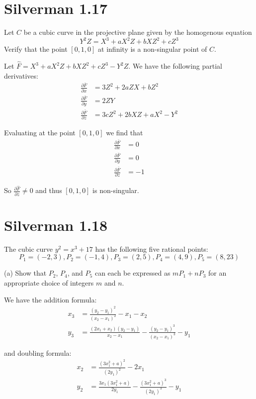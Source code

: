 \documentclass{article}
\begin{document}
\section{Silverman 1.17}
Let $C$ be a cubic curve in the projective plane given by the homogenous equation 
$$Y^2 Z = X^3 + aX^2 Z + bXZ^2 + cZ^3$$
Verify that the point $[0,1,0]$ at infinity is a non-singular point of $C$.

Let $\hat F = X^3 + aX^2 Z + bXZ^2 + cZ^3 - Y^2Z$. We have the following partial derivatives:
\begin{align*}
\frac{\partial \bar F}{\partial x} &= 3Z^2 + 2aZX + bZ^2 \\
\frac{\partial \bar F}{\partial y} &= 2ZY \\
\frac{\partial \bar F}{\partial z} &= 3cZ^2 + 2bXZ + aX^2 - Y^2
\end{align*}

Evaluating at the point $[0,1,0]$ we find that
\begin{align*}
\frac{\partial \bar F}{\partial x} &= 0 \\
\frac{\partial \bar F}{\partial y} &= 0 \\
\frac{\partial \bar F}{\partial z} &= -1
\end{align*}

So $\frac{\partial \hat F}{\partial z} \neq 0$ and thus $[0,1,0]$ is non-singular.

\section{Silverman 1.18}
The cubic curve $y^2 = x^3 + 17$ has the following five rational points:
$$P_1 = (-2,3), P_2 = (-1,4), P_3 = (2,5), P_4 = (4,9), P_5 = (8,23)$$

(a) Show that $P_2$, $P_4$, and $P_5$ can each be expressed as $mP_1 + nP_3$ for an appropriate choice of integers $m$ and $n$.

We have the addition formula:
\begin{align*}
x_3 &= \frac{(y_2 - y_1)^2}{(x_2-x_1)^2} - x_1 - x_2 \\
y_3 &= \frac{(2x_1 + x_2)(y_2-y_1)}{x_2-x_1} - \frac{(y_2-y_1)^3}{(x_2-x_1)^3} - y_1
\end{align*}

and doubling formula:
\begin{align*}
x_2 &= \frac{(3x_1^2 + a)^2}{(2y_1)^2} - 2x_1 \\
y_2 &= \frac{3x_1(3x_1^2 + a)}{2y_1} - \frac{(3x_1^2+a)^3}{(2y_1)^3}-y_1
\end{align*}
\end{document}
